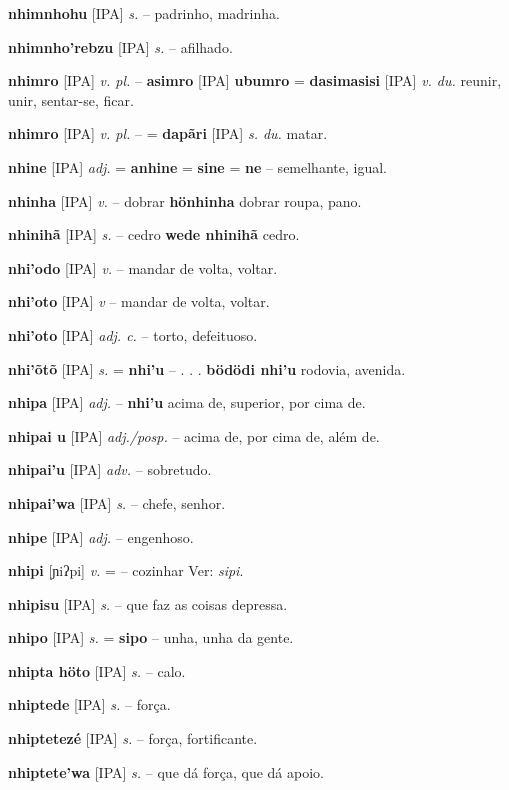\textbf{nhimnhohu} [IPA] \textit{s.} -- padrinho, madrinha.

\textbf{nhimnho'rebzu} [IPA] \textit{s.} -- afilhado.

\textbf{nhimro} [IPA] \textit{v. pl.} -- \textbf{asimro} [IPA] \textbf{ubumro} = \textbf{dasimasisi} [IPA] \textit{v. du.} reunir, unir, sentar-se, ficar.

\textbf{nhimro} [IPA] \textit{v. pl.} -- = \textbf{dapãri} [IPA] \textit{s. du.} matar.

\textbf{nhine} [IPA] \textit{adj.} = \textbf{anhine} = \textbf{sine} = \textbf{ne} -- semelhante, igual.

\textbf{nhinha} [IPA] \textit{v.} -- dobrar  \textbf{hönhinha} dobrar roupa, pano.

\textbf{nhinihã} [IPA] \textit{s.} -- cedro  \textbf{wede nhinihã} cedro.

\textbf{nhi'odo} [IPA] \textit{v.} -- mandar de volta, voltar.

\textbf{nhi'oto} [IPA] \textit{v} -- mandar de volta, voltar.

\textbf{nhi'oto} [IPA] \textit{adj. c.} -- torto, defeituoso.

\textbf{nhi'õtõ} [IPA] \textit{s.} = \textbf{nhi'u} -- . . .  \textbf{bödödi nhi'u} rodovia, avenida.

\textbf{nhipa} [IPA] \textit{adj.} -- \textbf{nhi'u} acima de, superior, por cima de.

\textbf{nhipai u} [IPA] \textit{adj./posp.} -- acima de, por cima de, além de.

\textbf{nhipai'u} [IPA] \textit{adv.} -- sobretudo.

\textbf{nhipai'wa} [IPA] \textit{s.} -- chefe, senhor.

\textbf{nhipe} [IPA] \textit{adj.} -- engenhoso.

\textbf{nhipi} [ɲiʔpi] \textit{v.} = -- cozinhar Ver: \textit{sipi}.

\textbf{nhipisu} [IPA] \textit{s.} -- que faz as coisas depressa.

\textbf{nhipo} [IPA] \textit{s.} = \textbf{sipo} -- unha, unha da gente.

\textbf{nhipta höto} [IPA] \textit{s.} -- calo.

\textbf{nhiptede} [IPA] \textit{s.} -- força.

\textbf{nhiptetezé} [IPA] \textit{s.} -- força, fortificante.

\textbf{nhiptete'wa} [IPA] \textit{s.} -- que dá força, que dá apoio.

